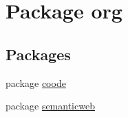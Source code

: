 \hypertarget{namespaceorg}{\section{Package org}
\label{namespaceorg}
}
\subsection*{Packages}
\begin{DoxyCompactItemize}
\item 
package \hyperlink{namespaceorg_1_1coode}{coode}
\item 
package \hyperlink{namespaceorg_1_1semanticweb}{semanticweb}
\end{DoxyCompactItemize}
